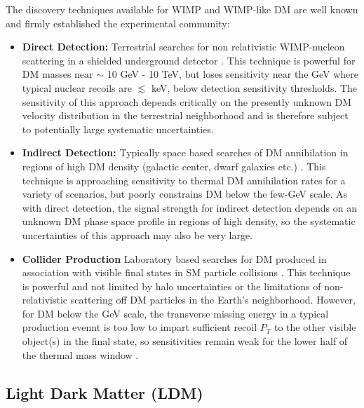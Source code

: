 The discovery techniques available for WIMP and WIMP-like DM are well known and firmly established the experimental community:
\begin{itemize}
\item {\bf Direct Detection:} Terrestrial searches for non relativistic WIMP-nucleon scattering in a shielded underground detector \cite{Undagoitia:2015gya}. This technique 
is powerful for DM masses near $\sim$ 10 GeV - 10 TeV, but loses sensitivity near the GeV where typical nuclear recoils are $\lesssim$ keV,
below detection sensitivity thresholds. The sensitivity of this approach depends critically on the presently unknown DM velocity distribution in the 
terrestrial neighborhood and is therefore subject to potentially large systematic uncertainties. 

\item {\bf Indirect Detection:} Typically space based searches of DM annihilation in regions of high DM density (galactic center, dwarf galaxies etc.) \cite{Conrad:2014tla}.
This technique is approaching sensitivity to thermal DM annihilation rates for a variety of scenarios, but poorly constrains DM below the 
few-GeV scale. As with direct detection, the signal strength for indirect detection depends on an unknown DM phase space profile in regions of high density, 
so the systematic uncertainties of this approach may also be very large. 

\item {\bf Collider Production} Laboratory based searches for DM produced in association with visible final states in SM particle collisions \cite{Askew:2014kqa}. This technique
is powerful and not limited by halo uncertainties or the limitations of non-relativistic scattering off DM particles in the Earth's neighborhood. However, 
for DM below the GeV scale, the transverse missing energy in a typical production evennt is too low to impart sufficient recoil $P_T$ to the other
visible object(s) in the final state, so sensitivities remain weak for the lower half of the thermal mass window \cite{Izaguirre:2015yja}. 

\end{itemize}

\subsection{Light Dark Matter (LDM)}

